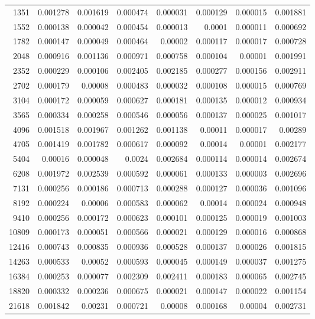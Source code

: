 \begin{longtable}{r r r r r r r r}
1351 & 0.001278 & 0.001619 & 0.000474 & 0.000031 & 0.000129 & 0.000015 & 0.001881 \\
1552 & 0.000138 & 0.000042 & 0.000454 & 0.000013 & 0.0001 & 0.000011 & 0.000692 \\
1782 & 0.000147 & 0.000049 & 0.000464 & 0.00002 & 0.000117 & 0.000017 & 0.000728 \\
2048 & 0.000916 & 0.001136 & 0.000971 & 0.000758 & 0.000104 & 0.00001 & 0.001991 \\
2352 & 0.000229 & 0.000106 & 0.002405 & 0.002185 & 0.000277 & 0.000156 & 0.002911 \\
2702 & 0.000179 & 0.00008 & 0.000483 & 0.000032 & 0.000108 & 0.000015 & 0.000769 \\
3104 & 0.000172 & 0.000059 & 0.000627 & 0.000181 & 0.000135 & 0.000012 & 0.000934 \\
3565 & 0.000334 & 0.000258 & 0.000546 & 0.000056 & 0.000137 & 0.000025 & 0.001017 \\
4096 & 0.001518 & 0.001967 & 0.001262 & 0.001138 & 0.00011 & 0.000017 & 0.00289 \\
4705 & 0.001419 & 0.001782 & 0.000617 & 0.000092 & 0.00014 & 0.00001 & 0.002177 \\
5404 & 0.00016 & 0.000048 & 0.0024 & 0.002684 & 0.000114 & 0.000014 & 0.002674 \\
6208 & 0.001972 & 0.002539 & 0.000592 & 0.000061 & 0.000133 & 0.000003 & 0.002696 \\
7131 & 0.000256 & 0.000186 & 0.000713 & 0.000288 & 0.000127 & 0.000036 & 0.001096 \\
8192 & 0.000224 & 0.00006 & 0.000583 & 0.000062 & 0.00014 & 0.000024 & 0.000948 \\
9410 & 0.000256 & 0.000172 & 0.000623 & 0.000101 & 0.000125 & 0.000019 & 0.001003 \\
10809 & 0.000173 & 0.000051 & 0.000566 & 0.000021 & 0.000129 & 0.000016 & 0.000868 \\
12416 & 0.000743 & 0.000835 & 0.000936 & 0.000528 & 0.000137 & 0.000026 & 0.001815 \\
14263 & 0.000533 & 0.00052 & 0.000593 & 0.000045 & 0.000149 & 0.000037 & 0.001275 \\
16384 & 0.000253 & 0.000077 & 0.002309 & 0.002411 & 0.000183 & 0.000065 & 0.002745 \\
18820 & 0.000332 & 0.000236 & 0.000675 & 0.000021 & 0.000147 & 0.000022 & 0.001154 \\
21618 & 0.001842 & 0.00231 & 0.000721 & 0.00008 & 0.000168 & 0.00004 & 0.002731 \\

\end{longtable}
